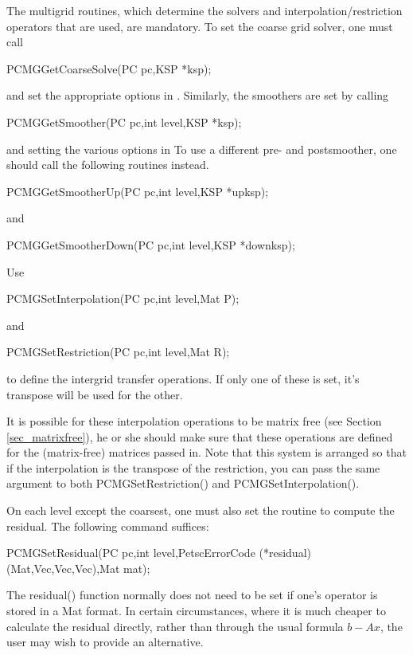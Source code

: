 The multigrid routines, which determine
the solvers and interpolation/restriction operators that are used,
are mandatory.
To set the coarse grid solver, one must 
call
\begin{tabbing}
  PCMGGetCoarseSolve(PC pc,KSP *ksp);
\end{tabbing}
and set the appropriate options in . Similarly, the
smoothers are set by calling
\begin{tabbing}
  PCMGGetSmoother(PC pc,int level,KSP *ksp);
\end{tabbing}
and setting the various options in 
To use a different pre- and postsmoother, one should call the following
routines instead.
\begin{tabbing}
  PCMGGetSmootherUp(PC pc,int level,KSP *upksp);
\end{tabbing}
and
\begin{tabbing}
  PCMGGetSmootherDown(PC pc,int level,KSP *downksp);
\end{tabbing}

Use
\begin{tabbing}
  PCMGSetInterpolation(PC pc,int level,Mat P);
\end{tabbing}
and
\begin{tabbing}
  PCMGSetRestriction(PC pc,int level,Mat R);
\end{tabbing}
to define the intergrid transfer operations.  If only one of these is
set, it's transpose will be used for the other.

It is possible for these interpolation operations to be matrix free
(see Section \ref{sec_matrixfree}),
he or she should make sure that these operations are defined for the (matrix-free) matrices
passed in.
Note that this system is arranged so that if the interpolation is
the transpose of the restriction, you can pass the same 
argument to both PCMGSetRestriction() and PCMGSetInterpolation().

On each level except the coarsest, one must also set the routine to
compute the residual.  The following command suffices:
\begin{tabbing}
   PCMGSetResidual(PC pc,int level,PetscErrorCode (*residual)(Mat,Vec,Vec,Vec),Mat mat);
\end{tabbing}
The residual() function normally does not need to be set if
one's operator is stored in a Mat format.  In certain circumstances,
where it is much cheaper to calculate the residual directly, rather
than through the usual formula $b - Ax$,  the user may wish to provide
an alternative.

